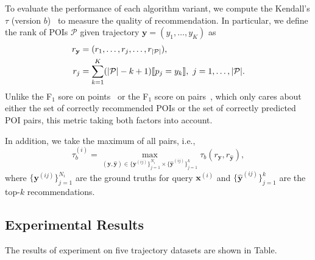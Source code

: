 To evaluate the performance of each algorithm variant, 
we compute the Kendall's $\tau$ (version $b$)~\cite{kendall1945,agresti2010analysis} to measure the quality of recommendation.
In particular,
we define the rank of POIs $\mathcal{P}$ given trajectory $\mathbf{y} = (y_1,\dots,y_K)$ as
\begin{align*} 
r_\mathbf{y} &= (r_1,\dots,r_j,\dots,r_{|\mathcal{P}|}), \\
r_j &= \sum_{k=1}^K (| \mathcal{P} | - k + 1)  \llbracket p_j = y_k \rrbracket, ~ j = 1, \dots, | \mathcal{P} |.
\end{align*}
Unlike the F$_1$ sore on points~\cite{ijcai15} or the F$_1$ score on pairs~\cite{cikm16paper}, 
which only cares about either the set of correctly recommended POIs or the set of correctly predicted POI pairs,
this metric taking both factors into account.

In addition, we take the maximum of all pairs,
i.e.,
\begin{equation*}
\tau_b^{(i)} = 
\max_{(\mathbf{y}, \hat{\mathbf{y}}) \in \{\mathbf{y}^{(ij)}\}_{j=1}^{N_i} \times \{\hat{\mathbf{y}}^{(ij)}\}_{j=1}^k} 
\tau_b(r_\mathbf{y}, r_{\hat{\mathbf{y}}}),
\end{equation*}
where $\{\mathbf{y}^{(ij)}\}_{j=1}^{N_i}$ are the ground truths for query $\mathbf{x}^{(i)}$ and
$\{\hat{\mathbf{y}}^{(ij)}\}_{j=1}^k$ are the top-$k$ recommendations.



\subsection{Experimental Results}
\label{sec:result}

The results of experiment on five trajectory datasets are shown in Table.
